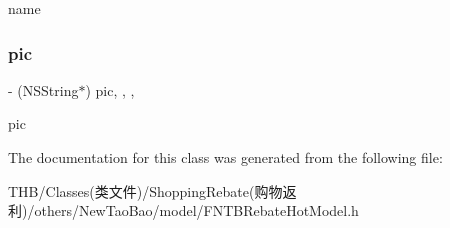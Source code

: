 name \mbox{\label{interface_f_n_t_b_rebate_hot_model_aa165822b252185a8ccea73cd42ce0897}} 
\subsubsection{\texorpdfstring{pic}{pic}}
{\footnotesize\ttfamily -\/ (N\+S\+String$\ast$) pic\hspace{0.3cm}{\ttfamily [read]}, {\ttfamily [write]}, {\ttfamily [nonatomic]}, {\ttfamily [copy]}}

pic 

The documentation for this class was generated from the following file\+:\begin{DoxyCompactItemize}
\item 
T\+H\+B/\+Classes(类文件)/\+Shopping\+Rebate(购物返利)/others/\+New\+Tao\+Bao/model/F\+N\+T\+B\+Rebate\+Hot\+Model.\+h\end{DoxyCompactItemize}

